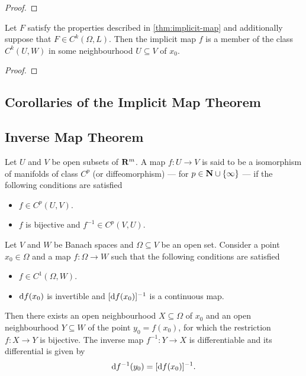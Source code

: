 \begin{proof}

\end{proof}

\begin{lemma}
\label{lem:Ck-implicit-map}
Let \(F\) satisfy the properties described in \cref{thm:implicit-map} and
additionally suppose that \(F \in C^k(\Omega, L)\). Then the implicit map \(f\) is
a member of the class \(C^k(U, W)\) in some neighbourhood \(U \subseteq V\) of \(x_0\).
\end{lemma}

\begin{proof}

\end{proof}


\subsection{Corollaries of the Implicit Map Theorem}

\subsection{Inverse Map Theorem}

\begin{definition}[Diffeomorphisms]
\label{def:diffeormorphism-on-R}
Let \(U\) and \(V\) be open subsets of \(\mathbf{R}^m\). A map \(f: U \to V\) is said to
be a isomorphism of manifolds of class \(C^p\) (or diffeomorphism) --- for \(p \in
\mathbf{N} \cup \{\infty\}\) --- if the following conditions are satisfied
\begin{itemize}\setlength\itemsep{0em}
  \item \(f \in C^p(U, V)\).
  \item \(f\) is bijective and \(f^{-1} \in C^p(V, U)\).
\end{itemize}
\end{definition}

\begin{theorem}
\label{thm:inverse-map}
Let \(V\) and \(W\) be Banach spaces and \(\Omega \subseteq V\) be an open
set. Consider a point \(x_0 \in \Omega\) and a map \(f: \Omega \to W\) such that the
following conditions are satisfied
\begin{itemize}\setlength\itemsep{0em}
  \item \(f \in C^1(\Omega, W)\).
  \item \(\mathrm{d} f(x_0)\) is invertible and \([\mathrm{d} f(x_{0})]^{-1}\) is a
  continuous map.
\end{itemize}
Then there exists an open neighbourhood \(X \subseteq \Omega\) of \(x_0\) and an open
neighbourhood \(Y \subseteq W\) of the point \(y_0 = f(x_0)\), for which the
restriction \(f: X \to Y\) is bijective. The inverse map \(f^{-1}: Y \to X\)
is differentiable and its differential is given by
\[
  \mathrm{d} f^{-1}(y_0) = [\mathrm{d} f(x_{0})]^{-1}.
\]
\end{theorem}

